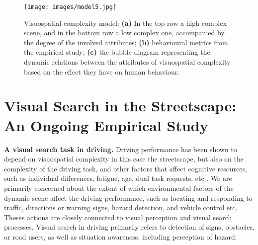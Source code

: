 \documentclass[a4paper]{article}
\begin{document}
\begin{figure}[t]
\begin{center}
\texttt{[image: images/model5.jpg]}
\caption{\sffamily\footnotesize Visuospatial complexity model: \textbf{(a)} In the top row a high complex scene, and in the bottom row a low complex one, accompanied by the degree of the involved attributes; \textbf{(b)} behavioural metrics from the empirical study; \textbf{(c)} the bubble diagram representing the dynamic relations between the attributes of visuospatial complexity based on the effect they have on human behaviour.}
\label{modelling_process}
\end{center}
\end{figure}


\section{\sffamily  Visual Search in the Streetscape: An Ongoing Empirical Study} \label{study}

 \textbf{\sffamily  A visual search task in driving.} \quad Driving performance has been shown to depend on visuospatial complexity in this case the streetscape, but also on the complexity of the driving task, and other factors that affect cognitive resources, such as individual differences, fatigue, age, dual task requests, etc \cite{Edquist2009, Wierda1996}. We are primarily concerned about the extent of which environmental factors of the dynamic scene affect the driving performance, such as locating and responding to traffic, directions or warning signs, hazard detection, and vehicle control etc. Theses actions are closely connected to visual perception and visual search processes. Visual search in driving primarily refers to detection of signs, obstacles, or road users, as well as situation awareness, including  perception of hazard.

\smallskip 
\end{document}

